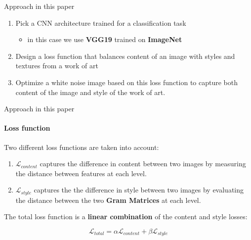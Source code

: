 \documentclass{beamer}
\begin{document}
\begin{frame}{Approach in this paper}
    \begin{enumerate}
        \item Pick a CNN architecture trained for a classification task
        \begin{itemize}
            \item in this case we use \textbf{VGG19} trained on
                \textbf{ImageNet}
        \end{itemize}
        \item Design a loss function that balances content of an image with
            styles and textures from a work of art
        \item Optimize a white noise image based on this loss function to
            capture both content of the image and style of the work of art.
    \end{enumerate}
\end{frame}



\begin{frame}{Approach in this paper}
    \framesubtitle{Loss function}

    Two different loss functions are taken into account:

    \begin{enumerate}
        \item $\mathcal{L}_{content}$ captures the difference in content
            between two images by measuring the distance between features at
            each level.
        \item $\mathcal{L}_{style}$ captures the the difference in style
            between two images by evaluating the distance between the two
            \textbf{Gram Matrices} at each level.
    \end{enumerate}

    The total loss function is a
    \textbf{\color{red} linear combination}
    of the content and style losses:

    $$
    \mathcal{L}_{total} =
    \alpha \mathcal{L}_{content} +
    \beta \mathcal{L}_{style}
    $$
\end{frame}
\end{document}

